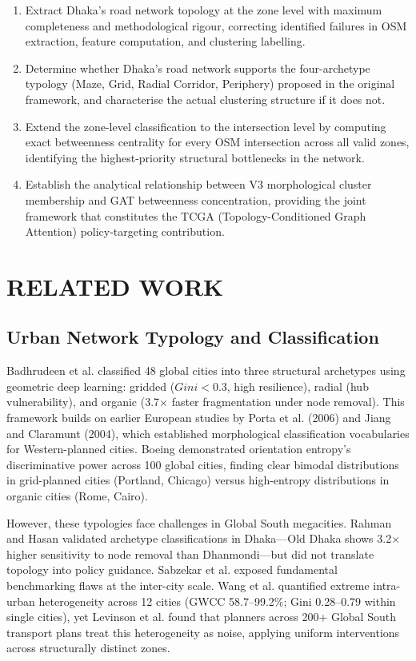 \documentclass[sigconf, nonacm]{acmart}
\begin{document}
\begin{enumerate}
    \item Extract Dhaka's road network topology at the zone level with maximum completeness and methodological rigour, correcting identified failures in OSM extraction, feature computation, and clustering labelling.
    \item Determine whether Dhaka's road network supports the four-archetype typology (Maze, Grid, Radial Corridor, Periphery) proposed in the original framework, and characterise the actual clustering structure if it does not.
    \item Extend the zone-level classification to the intersection level by computing exact betweenness centrality for every OSM intersection across all valid zones, identifying the highest-priority structural bottlenecks in the network.
    \item Establish the analytical relationship between V3 morphological cluster membership and GAT betweenness concentration, providing the joint framework that constitutes the TCGA (Topology-Conditioned Graph Attention) policy-targeting contribution.
\end{enumerate}

\section{RELATED WORK}

\subsection{Urban Network Typology and Classification}

Badhrudeen et al. \cite{badhrudeen2022} classified 48 global cities into three structural archetypes using geometric deep learning: gridded ($Gini < 0.3$, high resilience), radial (hub vulnerability), and organic (3.7$\times$ faster fragmentation under node removal). This framework builds on earlier European studies by Porta et al. (2006) and Jiang and Claramunt (2004), which established morphological classification vocabularies for Western-planned cities. Boeing \cite{boeing2021} demonstrated orientation entropy's discriminative power across 100 global cities, finding clear bimodal distributions in grid-planned cities (Portland, Chicago) versus high-entropy distributions in organic cities (Rome, Cairo).

However, these typologies face challenges in Global South megacities. Rahman and Hasan \cite{rahman2023} validated archetype classifications in Dhaka—Old Dhaka shows 3.2$\times$ higher sensitivity to node removal than Dhanmondi—but did not translate topology into policy guidance. Sabzekar et al. \cite{sabzekar2023} exposed fundamental benchmarking flaws at the inter-city scale. Wang et al. \cite{wang2020} quantified extreme intra-urban heterogeneity across 12 cities (GWCC 58.7--99.2\%; Gini 0.28--0.79 within single cities), yet Levinson et al. \cite{levinson2022} found that planners across 200+ Global South transport plans treat this heterogeneity as noise, applying uniform interventions across structurally distinct zones.
\end{document}
